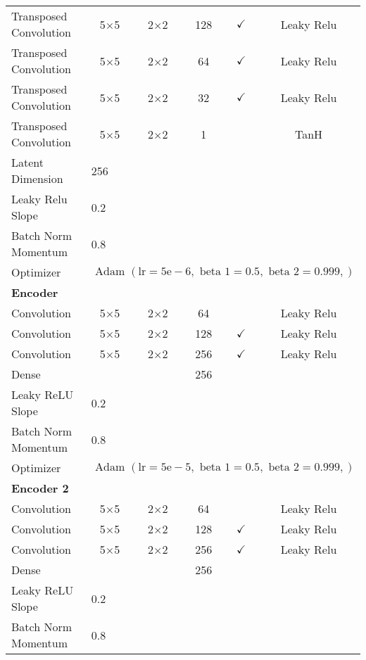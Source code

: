 \begin{longtable}[c]{@{}lccccc@{}}
	Transposed Convolution & \multicolumn{1}{c}{5$\times$5} & 2$\times$2 & 128 & $\checkmark$ & Leaky Relu \\
	Transposed Convolution & \multicolumn{1}{c}{5$\times$5} & 2$\times$2 & 64 & $\checkmark$ & Leaky Relu \\
	Transposed Convolution & \multicolumn{1}{c}{5$\times$5} & 2$\times$2 & 32 & $\checkmark$ & Leaky Relu \\
	Transposed Convolution & \multicolumn{1}{c}{5$\times$5} & 2$\times$2 & 1 &  & TanH\\
	Latent Dimension & \multicolumn{5}{l}{256} \\
	Leaky Relu Slope & \multicolumn{5}{l}{0.2} \\
	Batch Norm Momentum & \multicolumn{5}{l}{0.8} \\
	Optimizer & \multicolumn{5}{l}{$\text { Adam }(\mathrm{lr}=5 \mathrm{e}-6, \text { beta } 1=0.5, \text { beta } 2=0.999,)$} \\ \hline
	\multicolumn{6}{l}{\textbf{Encoder}} \\
	Convolution & \multicolumn{1}{c}{5$\times$5} & 2$\times$2 & 64 &  & Leaky Relu \\
	Convolution & \multicolumn{1}{c}{5$\times$5} & 2$\times$2 & 128 & $\checkmark$ & Leaky Relu \\
	Convolution & \multicolumn{1}{c}{5$\times$5} & 2$\times$2 & 256 & $\checkmark$ & Leaky Relu \\
	Dense & \multicolumn{1}{c}{} &  & 256 &  &  \\ 
	Leaky ReLU Slope & \multicolumn{5}{l}{0.2} \\
	Batch Norm Momentum & \multicolumn{5}{l}{0.8} \\
	Optimizer & \multicolumn{5}{l}{$\text { Adam }(\mathrm{lr}=5 \mathrm{e}-5, \text { beta } 1=0.5, \text { beta } 2=0.999,)$} \\ \hline
	\multicolumn{6}{l}{\textbf{Encoder 2}} \\
	Convolution & \multicolumn{1}{c}{5$\times$5} & 2$\times$2 & 64 &  & Leaky Relu \\
	Convolution & \multicolumn{1}{c}{5$\times$5} & 2$\times$2 & 128 & $\checkmark$ & Leaky Relu \\
	Convolution & \multicolumn{1}{c}{5$\times$5} & 2$\times$2 & 256 & $\checkmark$ & Leaky Relu \\
	Dense & \multicolumn{1}{c}{} &  & 256 &  &  \\ 
	Leaky ReLU Slope & \multicolumn{5}{l}{0.2} \\
	Batch Norm Momentum & \multicolumn{5}{l}{0.8} \\

\end{longtable}
